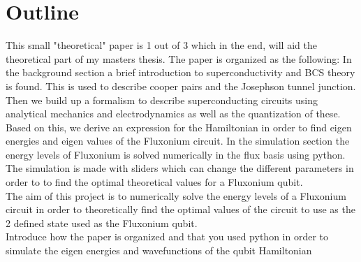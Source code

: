 \chapter{Outline}

This small "theoretical" paper is 1 out of 3 which in the end, will aid the theoretical part of my masters thesis. The paper is organized as the following: In the background section a brief introduction to superconductivity and BCS theory is found. This is used to describe cooper pairs and the Josephson tunnel junction. Then we build up a formalism to describe superconducting circuits using analytical mechanics and electrodynamics as well as the quantization of these. Based on this, we derive an expression for the Hamiltonian in order to find eigen energies and eigen values of the Fluxonium circuit. In the simulation section the energy levels of Fluxonium is solved numerically  in the flux basis using python. The simulation is made with sliders which can change the different parameters in order to to find the optimal theoretical values for a Fluxonium qubit. 
\\
The aim of this project is to numerically solve the energy levels of a Fluxonium circuit in order to theoretically find the optimal values of the circuit to use as the 2 defined state used as the Fluxonium qubit. 
\\
Introduce how the paper is organized and that you used python in order to simulate the eigen energies and wavefunctions of the qubit Hamiltonian